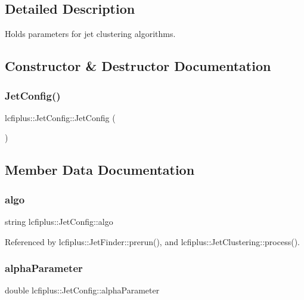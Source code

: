 \subsection{Detailed Description}
Holds parameters for jet clustering algorithms. 

\subsection{Constructor \& Destructor Documentation}
\mbox{\label{structlcfiplus_1_1JetConfig_ad3ddd9e08f00cb907548229a9d75d760}} 
\subsubsection{Jet\+Config()}
{\footnotesize\ttfamily lcfiplus\+::\+Jet\+Config\+::\+Jet\+Config (\begin{DoxyParamCaption}{ }\end{DoxyParamCaption})\hspace{0.3cm}{\ttfamily [inline]}}



\subsection{Member Data Documentation}
\mbox{\label{structlcfiplus_1_1JetConfig_a36e4cbee461be253d420b2f10cdafce9}} 
\subsubsection{algo}
{\footnotesize\ttfamily string lcfiplus\+::\+Jet\+Config\+::algo}



Referenced by lcfiplus\+::\+Jet\+Finder\+::prerun(), and lcfiplus\+::\+Jet\+Clustering\+::process().

\mbox{\label{structlcfiplus_1_1JetConfig_a4b070b5eb5bc0db2437e405828051914}} 
\subsubsection{alpha\+Parameter}
{\footnotesize\ttfamily double lcfiplus\+::\+Jet\+Config\+::alpha\+Parameter}



